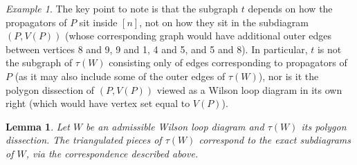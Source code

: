 \documentclass[11pt]{article}
\newtheorem{lem}[thm]{Lemma}
\theoremstyle{remark}
\newtheorem{eg}[thm]{Example}
\theoremstyle{definition}
\begin{document}
\begin{eg}
The key point to note is that the subgraph $t$ depends on how the propagators of $P$ sit inside $[n]$, not on how they sit in the subdiagram $(P,V(P))$ (whose corresponding graph would have additional outer edges between vertices 8 and 9, 9 and 1, 4 and 5, and 5 and 8).  In particular, $t$ is not the subgraph of $\tau(W)$ consisting only of edges corresponding to propagators of $P$ (as it may also include some of the outer edges of $\tau(W)$), nor is it the polygon dissection of $(P,V(P))$ viewed as a Wilson loop diagram in its own right (which would have vertex set equal to $V(P)$).
\end{eg}

\begin{lem}\label{lem triang to exact}
  Let $W$ be an admissible Wilson loop diagram and $\tau(W)$ its polygon dissection.  The triangulated pieces of $\tau(W)$ correspond to the exact subdiagrams of $W$, via the correspondence described above.
\end{lem}
\end{document}
